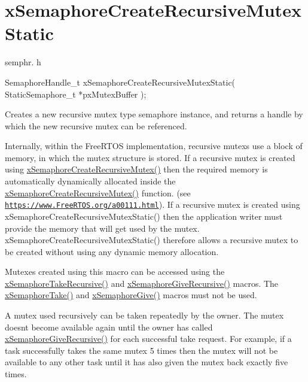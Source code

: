 \hypertarget{group__x_semaphore_create_recursive_mutex_static}{}\section{x\+Semaphore\+Create\+Recursive\+Mutex\+Static}
\label{group__x_semaphore_create_recursive_mutex_static}
semphr. h 
\begin{DoxyPre}
SemaphoreHandle\_t xSemaphoreCreateRecursiveMutexStatic( StaticSemaphore\_t *pxMutexBuffer );
\end{DoxyPre}


Creates a new recursive mutex type semaphore instance, and returns a handle by which the new recursive mutex can be referenced.

Internally, within the Free\+R\+T\+OS implementation, recursive mutexs use a block of memory, in which the mutex structure is stored. If a recursive mutex is created using \hyperlink{vendor_2ceedling_2plugins_2freertos_2src_2freertos_2include_2semphr_8h_a1bbc843be5a41ea83d2693b2189fc0f8}{x\+Semaphore\+Create\+Recursive\+Mutex()} then the required memory is automatically dynamically allocated inside the \hyperlink{vendor_2ceedling_2plugins_2freertos_2src_2freertos_2include_2semphr_8h_a1bbc843be5a41ea83d2693b2189fc0f8}{x\+Semaphore\+Create\+Recursive\+Mutex()} function. (see \href{https://www.FreeRTOS.org/a00111.html}{\tt https\+://www.\+Free\+R\+T\+O\+S.\+org/a00111.\+html}). If a recursive mutex is created using x\+Semaphore\+Create\+Recursive\+Mutex\+Static() then the application writer must provide the memory that will get used by the mutex. x\+Semaphore\+Create\+Recursive\+Mutex\+Static() therefore allows a recursive mutex to be created without using any dynamic memory allocation.

Mutexes created using this macro can be accessed using the \hyperlink{vendor_2ceedling_2plugins_2freertos_2src_2freertos_2include_2semphr_8h_ad395f4bba51eea6af3397d72bc079e4d}{x\+Semaphore\+Take\+Recursive()} and \hyperlink{vendor_2ceedling_2plugins_2freertos_2src_2freertos_2include_2semphr_8h_a398d66b17856c22dd49d39aaac42f105}{x\+Semaphore\+Give\+Recursive()} macros. The \hyperlink{externals_2freertos_2include_2semphr_8h_af116e436d2a5ae5bd72dbade2b5ea930}{x\+Semaphore\+Take()} and \hyperlink{externals_2freertos_2include_2semphr_8h_aae55761cabfa9bf85c8f4430f78c0953}{x\+Semaphore\+Give()} macros must not be used.

A mutex used recursively can be \textquotesingle{}taken\textquotesingle{} repeatedly by the owner. The mutex doesn\textquotesingle{}t become available again until the owner has called \hyperlink{vendor_2ceedling_2plugins_2freertos_2src_2freertos_2include_2semphr_8h_a398d66b17856c22dd49d39aaac42f105}{x\+Semaphore\+Give\+Recursive()} for each successful \textquotesingle{}take\textquotesingle{} request. For example, if a task successfully \textquotesingle{}takes\textquotesingle{} the same mutex 5 times then the mutex will not be available to any other task until it has also \textquotesingle{}given\textquotesingle{} the mutex back exactly five times.

